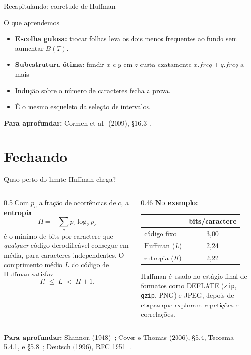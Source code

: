 \documentclass[aspectratio=169,xcolor=table]{beamer}
\newcommand{\fonte}[1]{%
  \vfill
  {\tiny\color{gray!55!black}\textbf{Para aprofundar:} #1\par}%
}
\begin{document}
\begin{frame}{Recapitulando: corretude de Huffman}
  \begin{block}{O que aprendemos}
    \begin{itemize}
      \item \textbf{Escolha gulosa:} trocar folhas leva os dois menos frequentes ao fundo
            sem aumentar $B(T)$.
      \item \textbf{Subestrutura ótima:} fundir $x$ e $y$ em $z$ custa exatamente
            $x.\mathit{freq} + y.\mathit{freq}$ a mais.
      \item Indução sobre o número de caracteres fecha a prova.
      \item É o mesmo esqueleto da seleção de intervalos.
    \end{itemize}
  \end{block}
  \fonte{Cormen et al.\ (2009), \S 16.3~\cite{cormen2009introduction}.}
\end{frame}

\section{Fechando}

\begin{frame}{Quão perto do limite Huffman chega?}
  \begin{columns}[T]
    \begin{column}{0.5\textwidth}
      \scriptsize
      Com $p_c$ a fração de ocorrências de $c$, a \textbf{entropia}
      \[ H = -\sum_{c} p_c \log_2 p_c \]
      é o mínimo de bits por caractere que \emph{qualquer} código decodificável consegue em
      média, para caracteres independentes. O comprimento médio $L$ do código de Huffman
      satisfaz
      \[ H \;\le\; L \;<\; H + 1 . \]
    \end{column}
    \begin{column}{0.46\textwidth}
      \scriptsize
      \textbf{No exemplo:}
      \begin{center}
      \begin{tabular}{lc}
        \toprule
        & bits/caractere \\
        \midrule
        código fixo & 3{,}00 \\
        Huffman ($L$) & 2{,}24 \\
        entropia ($H$) & 2{,}22 \\
        \bottomrule
      \end{tabular}
      \end{center}
      \smallskip
      Huffman é usado no estágio final de formatos como DEFLATE (\texttt{zip}, \texttt{gzip},
      PNG) e JPEG, depois de etapas que exploram repetições e correlações.
    \end{column}
  \end{columns}
  \fonte{Shannon (1948)~\cite{shannon1948mathematical}; Cover e Thomas (2006), \S 5.4,
    Teorema 5.4.1, e \S 5.8~\cite{cover2006elements}; Deutsch (1996), RFC
    1951~\cite{deutsch1996deflate}.}
\end{frame}
\end{document}
